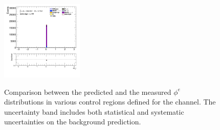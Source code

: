 \begin{figure}[!htp]
\begin{center}
			\includegraphics[width=0.35\textwidth]{chapters/chapter6_HPlus/images/taulep/el_0_phi_SS_TAUMU.png} \\
			\end{center}
			\caption{
			Comparison between the predicted and the measured $\phi^{e}$ distributions in various control regions defined for the \taulep channel. The uncertainty band includes both statistical and systematic uncertainties on the background prediction. 
			}
			\label{fig:bkg-phi-el-taulep}
		\end{figure}

